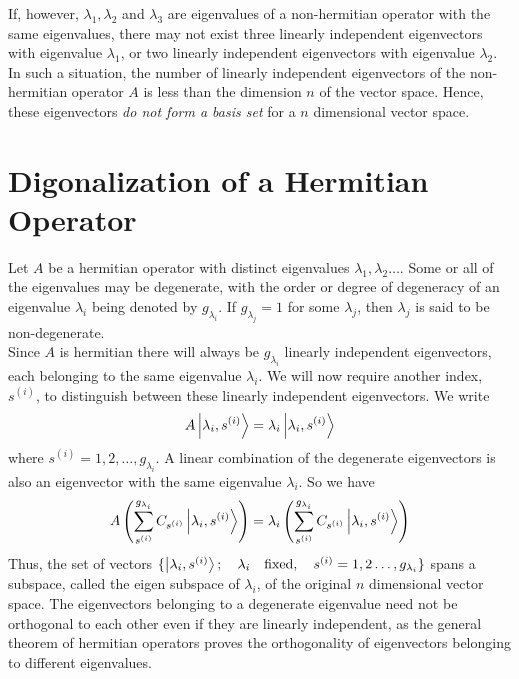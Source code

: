 	If, however, $\lambda_1, \lambda_2$ and $\lambda_3$ are eigenvalues of a non-hermitian operator with the same eigenvalues, there may not exist three linearly independent eigenvectors with eigenvalue $\lambda_1$, or  two linearly independent eigenvectors with eigenvalue $\lambda_2$. In such a situation, the number of linearly independent eigenvectors of the non-hermitian operator $A$ is less than the dimension $n$ of the vector space. Hence, these eigenvectors \textit{do not form a basis set} for a $n$ dimensional vector space.
	
	
	
	\section{Digonalization of a Hermitian Operator}
	Let $A$ be a hermitian operator with distinct eigenvalues $\lambda_1,\lambda_2\ldots$. Some or all of the eigenvalues may be degenerate, with the order or degree of degeneracy of an eigenvalue $\lambda_i$ being denoted by $g_{\lambda_i}$. If $g_{\lambda_j}=1$ for some $\lambda_j$, then $\lambda_j$ is said to be non-degenerate.\\
	
	Since $A$ is hermitian there will always be $g_{\lambda_i}$ linearly independent eigenvectors, each belonging to the same eigenvalue $\lambda_i$. We will now require another index, $s^{(i)}$, to distinguish between these linearly independent eigenvectors. We write
	\begin{equation}
		A \ket{\lambda_i, s^{(i)}} = \lambda_i \ket{\lambda_i, s^{(i)}}
		\label{chapter5.eqn9-eigenvectors-with-two-index}
	\end{equation}
	where $s^{(i)} = 1, 2, \ldots, g_{\lambda_i}$. A linear combination of the degenerate eigenvectors is also an eigenvector with the same eigenvalue $\lambda_i$. So we have
	\begin{equation}
		A \left(\sum_{s^{(i)}}^{g_{\lambda_i}}  C_{s^{(i)}} \ket{\lambda_i, s^{(i)}}\right) = \lambda_i \left(\sum_{s^{(i)}}^{g_{\lambda_i}}  C_{s^{(i)}} \ket{\lambda_i, s^{(i)}}\right)
		\label{chapter5.eqn10-combination-degenerate-eigenvectors}
	\end{equation}
	Thus, the set of vectors $\{ \ket{\lambda_i, s^{(i)}}; \quad \lambda_i \quad \text{fixed}, \quad s^{(i)}=1,2\ldots,g_{\lambda_i} \}$ spans a subspace, called the eigen subspace of $\lambda_i$, of the original $n$ dimensional vector space. The eigenvectors belonging to a degenerate eigenvalue need not be orthogonal to each other even if they are linearly independent, as the general theorem of hermitian operators proves the orthogonality of eigenvectors belonging to different eigenvalues.\\
	
